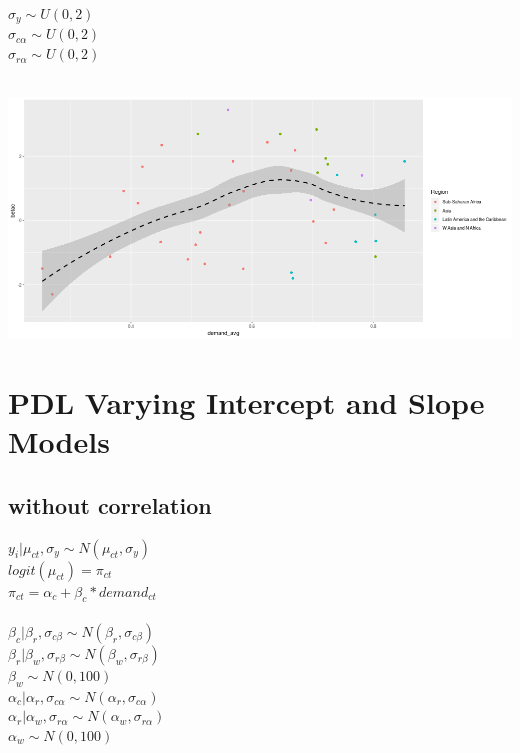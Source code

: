 \documentclass[12pt]{article}
\begin{document}
\noindent
 $ \sigma_y \sim U(0,2) $ \\
 $ \sigma_{c\alpha} \sim U(0,2) $ \\
 $ \sigma_{r\alpha}\sim U(0,2) $ \\
\\
\begin{center}
\includegraphics[scale=0.4]{1.png}
\end{center}
\newpage
\section{PDL Varying Intercept and Slope Models}
\subsection{without correlation}
$ y_i|\mu_{ct},\sigma_y \sim N(\mu_{ct}, \sigma_y) $ \\
$ logit(\mu_{ct})=  \pi_{ct} $\\
$ \pi_{ct} = \alpha_c + \beta_c*demand_{ct} $\\
\\
$ \beta_c |\beta_r,\sigma_{c\beta} \sim N(\beta_r,\sigma_{c\beta}) $ \\
$ \beta_r|\beta_w,\sigma_{r\beta} \sim N(\beta_w, \sigma_{r\beta}) $\\
$ \beta_w \sim N(0, 100) $\\
$ \alpha_c|\alpha_r,\sigma_{c\alpha} \sim N(\alpha_r,\sigma_{c\alpha}) $ \\
$ \alpha_r|\alpha_w,\sigma_{r\alpha} \sim N(\alpha_w, \sigma_{r\alpha}) $\\
$ \alpha_w \sim N(0, 100) $\\
\end{document}
